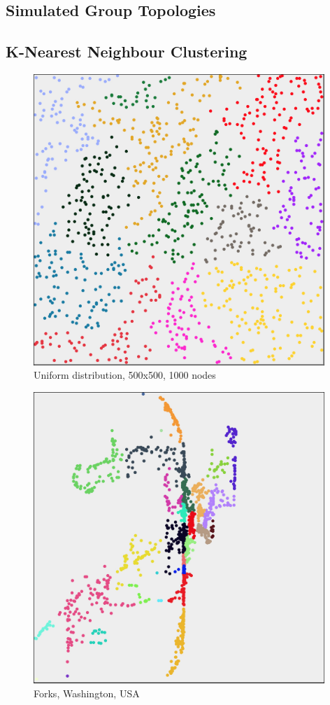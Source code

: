\begin{appendices}

	\chapter{Simulated Group Topologies}
	\section{K-Nearest Neighbour Clustering}
	\label{appendix:knn}
	\begin{figure}
		\centering
		\includegraphics[width=11cm]{Images/computations/BASIC500x500_1000n.jpg}
		\caption{Uniform distribution, 500x500, 1000 nodes}
	\end{figure}

	\begin{figure}[H]
		\centering
		\includegraphics[width=11cm]{Images/computations/BASICForks.jpg}
		\caption{Forks, Washington, USA}
	\end{figure}


\end{appendices}
